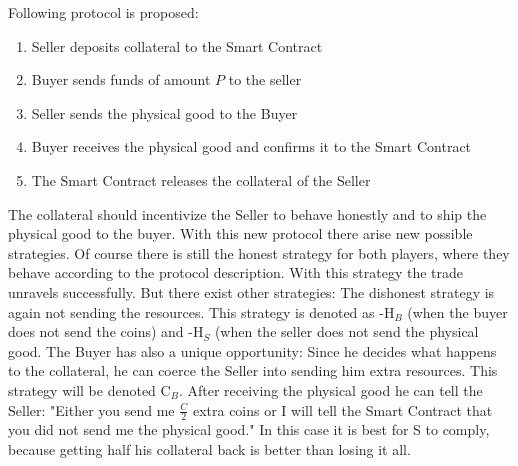 \documentclass{cacthesis}
\begin{document}
Following protocol is proposed:
\begin{enumerate}
    \item Seller deposits collateral to the Smart Contract
    \item Buyer sends funds of amount $P$ to the seller 
    \item Seller sends the physical good to the Buyer
    \item Buyer receives the physical good and confirms it to the Smart Contract
    \item The Smart Contract releases the collateral of the Seller
\end{enumerate}
The collateral should incentivize the Seller to behave honestly and to ship the physical good to the buyer.
With this new protocol there arise new possible strategies. Of course there is still the honest strategy for both players, where they behave according to the protocol description. With this strategy the trade unravels successfully.\newline
But there exist other strategies: The dishonest strategy is again not sending the resources. This strategy is denoted as -H$_B$ (when the buyer does not send the coins) and -H$_S$ (when the seller does not send the physical good.\newline
The Buyer has also a unique opportunity: Since he decides what happens to the collateral, he can coerce the Seller into sending him extra resources. This strategy will be denoted C$_B$.  After receiving the physical good he can tell the Seller: "Either you send me $\frac{C}{2}$ extra coins or I will tell the Smart Contract that you did not send me the physical good." In this case it is best for S to comply, because getting half his collateral back is better than losing it all. \newline
\end{document}
